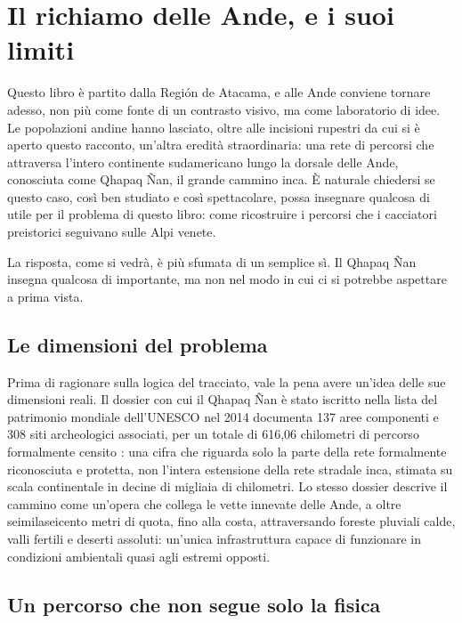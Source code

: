 \chapter{Il richiamo delle Ande, e i suoi limiti}
\label{cap:qhapaq_nan}

Questo libro è partito dalla Región de Atacama, e alle Ande conviene tornare adesso, non più come fonte di un contrasto visivo, ma come laboratorio di idee. Le popolazioni andine hanno lasciato, oltre alle incisioni rupestri da cui si è aperto questo racconto, un'altra eredità straordinaria: una rete di percorsi che attraversa l'intero continente sudamericano lungo la dorsale delle Ande, conosciuta come Qhapaq Ñan, il grande cammino inca. È naturale chiedersi se questo caso, così ben studiato e così spettacolare, possa insegnare qualcosa di utile per il problema di questo libro: come ricostruire i percorsi che i cacciatori preistorici seguivano sulle Alpi venete.

La risposta, come si vedrà, è più sfumata di un semplice sì. Il Qhapaq Ñan insegna qualcosa di importante, ma non nel modo in cui ci si potrebbe aspettare a prima vista.

\section{Le dimensioni del problema}

Prima di ragionare sulla logica del tracciato, vale la pena avere un'idea delle sue dimensioni reali. Il dossier con cui il Qhapaq Ñan è stato iscritto nella lista del patrimonio mondiale dell'UNESCO nel 2014 documenta 137 aree componenti e 308 siti archeologici associati, per un totale di 616,06 chilometri di percorso formalmente censito \citep{unesco_qhapaqnan}: una cifra che riguarda solo la parte della rete formalmente riconosciuta e protetta, non l'intera estensione della rete stradale inca, stimata su scala continentale in decine di migliaia di chilometri. Lo stesso dossier descrive il cammino come un'opera che collega le vette innevate delle Ande, a oltre seimilaseicento metri di quota, fino alla costa, attraversando foreste pluviali calde, valli fertili e deserti assoluti: un'unica infrastruttura capace di funzionare in condizioni ambientali quasi agli estremi opposti.

\section{Un percorso che non segue solo la fisica}

